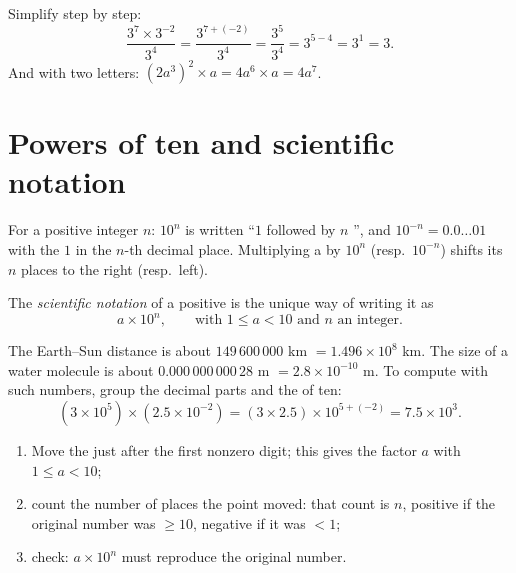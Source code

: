 \begin{example}\label{ex:g9:fractions:rules}
Simplify step by step:
\[
\frac{3^7 \times 3^{-2}}{3^4}
= \frac{3^{7 + (-2)}}{3^4}
= \frac{3^5}{3^4}
= 3^{5-4} = 3^1 = 3 .
\]
And with two letters: $(2a^3)^2 \times a = 4 a^6 \times a = 4a^7$.
\end{example}

\section{Powers of ten and scientific notation}

\begin{proposition}\label{prop:g9:fractions:ten}
For a positive integer $n$: $10^n$ is written ``$1$ followed by $n$
'', and $10^{-n} = 0.0\dots01$ with the $1$ in the $n$-th decimal
place. Multiplying a  by $10^n$ (resp.\ $10^{-n}$) shifts
its  $n$ places to the right (resp.\ left).
\end{proposition}

\begin{definition}\label{def:g9:fractions:scientific}
The \emph{scientific notation} of a positive
 is the unique way of writing it as
\[
a \times 10^n,
\qquad\text{with } 1 \leq a < 10 \text{ and } n \text{ an integer.}
\]
\end{definition}

\begin{example}\label{ex:g9:fractions:scientific}
The Earth--Sun distance is about $149\,600\,000$ km $= 1.496 \times
10^8$ km. The size of a water molecule is about $0.000\,000\,000\,28$ m
$= 2.8 \times 10^{-10}$ m. To compute with such numbers, group the
decimal parts and the  of ten:
\[
(3 \times 10^5) \times (2.5 \times 10^{-2})
= (3 \times 2.5) \times 10^{5 + (-2)}
= 7.5 \times 10^{3}.
\]
\end{example}

\begin{method}\label{met:g9:fractions:scientific}
\begin{enumerate}
  \item Move the  just after the first nonzero digit; this
        gives the factor $a$ with $1 \leq a < 10$;
  \item count the number of places the point moved: that count is $n$,
        positive if the original number was $\geq 10$, negative if it was
        $< 1$;
  \item check: $a \times 10^n$ must reproduce the original number.
\end{enumerate}
\end{method}

